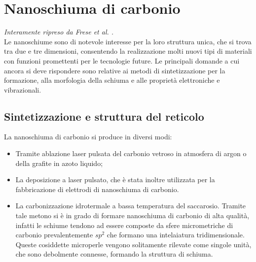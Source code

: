 \documentclass[a4paper,titlepage]{book}
\begin{document}
\chapter{Nanoschiuma di carbonio}
\textit{Interamente ripreso da Frese et al. \cite{foamm}.} \\
Le nanoschiume sono di notevole interesse per la loro struttura unica, che si trova tra due e tre dimensioni, consentendo la realizzazione molti nuovi tipi di materiali con funzioni promettenti per le tecnologie future. 
Le principali domande a cui ancora si deve rispondere sono relative ai metodi di sintetizzazione per la formazione, alla morfologia della schiuma e alle proprietà elettroniche e vibrazionali.
\section{Sintetizzazione e struttura del reticolo}
La nanoschiuma di carbonio si produce in diversi modi:\\
\begin{itemize}
	\item Tramite ablazione laser pulsata del carbonio vetroso in atmosfera di argon o della grafite in azoto liquido;
	\item La deposizione a laser pulsato, che è stata inoltre utilizzata per la fabbricazione di elettrodi di nanoschiuma di carbonio.
	\item La  carbonizzazione idrotermale a bassa temperatura del saccarosio. Tramite tale metono si è in grado di formare nanoschiuma di carbonio di alta qualità, infatti le schiume tendono ad essere composte da sfere micrometriche di carbonio prevalentemente $sp^2$ che formano una intelaiatura tridimensionale. Queste cosiddette microperle vengono solitamente rilevate come singole unità, che sono debolmente connesse, formando la struttura di schiuma.\\
\end{itemize}
\end{document}
